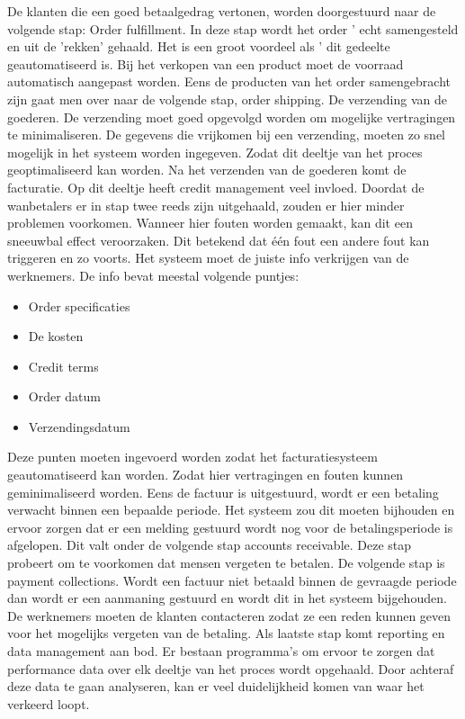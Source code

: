 De klanten die een goed betaalgedrag vertonen, worden doorgestuurd naar de volgende stap: Order fulfillment. In deze stap wordt het order ' echt samengesteld en uit de 'rekken' gehaald. Het is een groot voordeel als ' dit gedeelte geautomatiseerd is. Bij het verkopen van een product moet de voorraad automatisch aangepast worden. Eens de producten van het order samengebracht zijn gaat  men  over naar de volgende stap, order shipping. De verzending van de goederen. De verzending moet goed opgevolgd worden om mogelijke vertragingen te minimaliseren. De gegevens die vrijkomen bij een verzending, moeten zo snel mogelijk in het systeem worden ingegeven. Zodat dit deeltje van het proces geoptimaliseerd kan worden. 
Na het verzenden van de goederen komt de facturatie. Op dit deeltje heeft credit management veel invloed. Doordat de wanbetalers er in stap twee reeds zijn uitgehaald, zouden er hier minder problemen voorkomen. Wanneer hier fouten worden gemaakt, kan dit een sneeuwbal effect veroorzaken. Dit betekend dat één fout een andere fout kan triggeren en zo voorts. Het systeem moet de juiste info verkrijgen van de  werknemers. De info bevat meestal volgende puntjes:
\begin{itemize}
	\item Order specificaties
	\item De kosten
	\item Credit terms
	\item Order datum
	\item Verzendingsdatum
\end{itemize}
Deze punten moeten ingevoerd worden zodat het facturatiesysteem geautomatiseerd kan worden. Zodat hier vertragingen en fouten kunnen geminimaliseerd worden. Eens de factuur is uitgestuurd, wordt er een betaling verwacht binnen een bepaalde periode. Het systeem zou dit moeten bijhouden en ervoor zorgen dat er een melding gestuurd wordt nog voor de betalingsperiode is afgelopen. Dit valt onder de volgende stap accounts receivable. Deze stap probeert om te voorkomen dat mensen vergeten te betalen. 
De volgende stap is payment collections. Wordt een factuur niet betaald binnen de gevraagde periode dan wordt er een aanmaning gestuurd en wordt dit in het systeem bijgehouden. De  werknemers moeten de klanten contacteren zodat ze een reden kunnen geven voor het mogelijks vergeten van de betaling. 
Als laatste stap komt reporting en data management aan bod. Er bestaan programma's om ervoor te zorgen dat performance data over elk deeltje van het proces wordt opgehaald. Door achteraf deze data te gaan analyseren, kan er veel duidelijkheid komen van waar het verkeerd loopt. 

